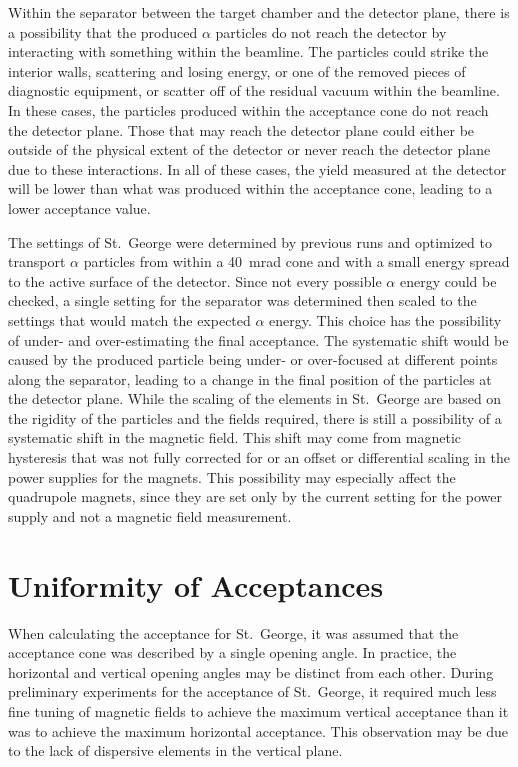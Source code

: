 Within the separator between the target chamber and the detector plane,
there is a possibility that the produced $\alpha$ particles do not reach
the detector by interacting with something within the beamline. The
particles could strike the interior walls, scattering and losing energy,
or one of the removed pieces of diagnostic equipment, or scatter off of
the residual vacuum within the beamline. In these cases, the particles
produced within the acceptance cone do not reach the detector plane.
Those that may reach the detector plane could either be outside of the
physical extent of the detector or never reach the detector plane due
to these interactions. In all of these cases, the yield measured at the
detector will be lower than what was produced within the acceptance
cone, leading to a lower acceptance value.

The settings of St.\ George were determined by previous runs and
optimized to transport $\alpha$ particles from within a 40~mrad cone and
with a small energy spread to the active surface of the detector. Since
not every possible $\alpha$ energy could be checked, a single setting
for the separator was determined then scaled to the settings that would
match the expected $\alpha$ energy. This choice has the possibility of
under- and over-estimating the final acceptance. The systematic shift
would be caused by the produced particle being under- or over-focused at
different points along the separator, leading to a change in the final
position of the particles at the detector plane. While the scaling of
the elements in St.\ George are based on the rigidity of the particles
and the fields required, there is still a possibility of a systematic
shift in the magnetic field. This shift may come from magnetic
hysteresis that was not fully corrected for or an offset or differential
scaling in the power supplies for the magnets. This possibility may
especially affect the quadrupole magnets, since they are set only by the
current setting for the power supply and not a magnetic field
measurement.


\section{Uniformity of Acceptances}
\label{sec:uniformity-of-acceptances}

When calculating the acceptance for St.\ George, it was assumed that the
acceptance cone was described by a single opening angle. In practice,
the horizontal and vertical opening angles may be distinct from each
other. During preliminary experiments for the acceptance of St.\ George,
it required much less fine tuning of magnetic fields to achieve the
maximum vertical acceptance than it was to achieve the maximum
horizontal acceptance. This observation may be due to the lack of
dispersive elements in the vertical plane.

